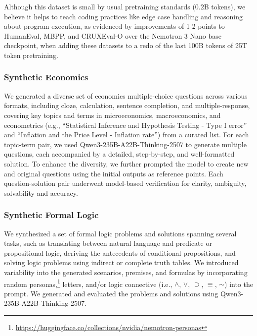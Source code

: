 Although this dataset is small by usual pretraining standards (0.2B tokens), we believe it helps to teach coding practices like edge case handling and reasoning about program execution, as evidenced by improvements of 1-2 points to HumanEval, MBPP, and CRUXEval-O over the Nemotron 3 Nano base checkpoint, when adding these datasets to a redo of the last 100B tokens of 25T token pretraining.

\subsubsection{Synthetic Economics}

We generated a diverse set of economics multiple-choice questions across various formats, including cloze, calculation, sentence completion, and multiple-response, covering key topics and terms in microeconomics, macroeconomics, and econometrics (e.g., ``Statistical Inference and Hypothesis Testing - Type I error'' and ``Inflation and the Price Level - Inflation rate'') from a curated list. For each topic-term pair, we used Qwen3-235B-A22B-Thinking-2507 to generate multiple questions, each accompanied by a detailed, step-by-step, and well-formatted solution. To enhance the diversity, we further prompted the model to create new and original questions using the initial outputs as reference points. Each question-solution pair underwent model-based verification for clarity, ambiguity, solvability and accuracy.


\subsubsection{Synthetic Formal Logic}

We synthesized a set of formal logic problems and solutions spanning several tasks, such as translating between natural language and predicate or propositional logic, deriving the antecedents of conditional propositions, and solving logic problems using indirect or complete truth tables.
We introduced variability into the generated scenarios, premises, and formulas by incorporating random personas,\footnote{\url{https://huggingface.co/collections/nvidia/nemotron-personas}} letters, and/or logic connective (i.e., $\land$, $\lor$, $\supset$, $\equiv$, $\sim$) into the prompt.
We generated and evaluated the problems and solutions using Qwen3-235B-A22B-Thinking-2507.

